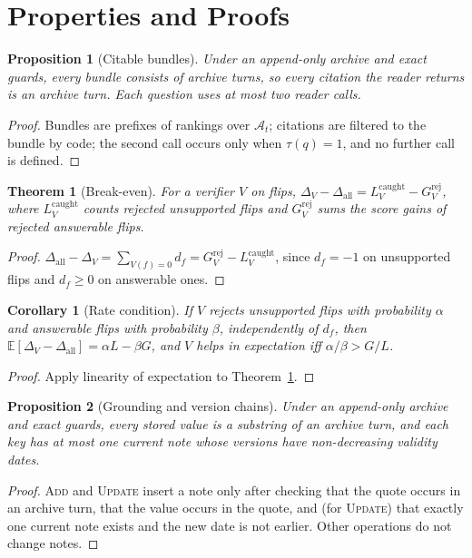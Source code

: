 \documentclass[10pt]{article}
\theoremstyle{plain}
\newtheorem{proposition}{Proposition}
\newtheorem{theorem}{Theorem}
\newtheorem{corollary}{Corollary}
\newcommand{\A}{\mathcal{A}}
\begin{document}



\appendix

\section{Properties and Proofs}
\label{app:proofs}

\begin{proposition}[Citable bundles]\label{prop:projection}
Under an append-only archive and exact guards, every bundle consists of archive turns, so every citation the
reader returns is an archive turn. Each question uses at most two reader calls.
\end{proposition}
\begin{proof}
Bundles are prefixes of rankings over $\A_t$; citations are filtered to the bundle by code; the second call
occurs only when $\tau(q)=1$, and no further call is defined.
\end{proof}

\begin{theorem}[Break-even]\label{thm:breakeven}
For a verifier $V$ on flips, $\Delta_V-\Delta_{\mathrm{all}}=L^{\mathrm{caught}}_V-G^{\mathrm{rej}}_V$, where
$L^{\mathrm{caught}}_V$ counts rejected unsupported flips and $G^{\mathrm{rej}}_V$ sums the score gains of rejected
answerable flips.
\end{theorem}
\begin{proof}
$\Delta_{\mathrm{all}}-\Delta_V=\sum_{V(f)=0}d_f=G^{\mathrm{rej}}_V-L^{\mathrm{caught}}_V$, since $d_f=-1$ on unsupported
flips and $d_f\ge0$ on answerable ones.
\end{proof}

\begin{corollary}[Rate condition]\label{cor:rate}
If $V$ rejects unsupported flips with probability $\alpha$ and answerable flips with probability $\beta$,
independently of $d_f$, then $\mathbb{E}[\Delta_V-\Delta_{\mathrm{all}}]=\alpha L-\beta G$, and $V$ helps in
expectation iff $\alpha/\beta>G/L$.
\end{corollary}
\begin{proof}
Apply linearity of expectation to Theorem~\ref{thm:breakeven}.
\end{proof}

\begin{proposition}[Grounding and version chains]\label{prop:grounding}
Under an append-only archive and exact guards, every stored value is a substring of an archive turn, and each
key has at most one current note whose versions have non-decreasing validity dates.
\end{proposition}
\begin{proof}
\textsc{Add} and \textsc{Update} insert a note only after checking that the quote occurs in an archive turn, that the
value occurs in the quote, and (for \textsc{Update}) that exactly one current note exists and the new date is not
earlier. Other operations do not change notes.
\end{proof}
\end{document}
